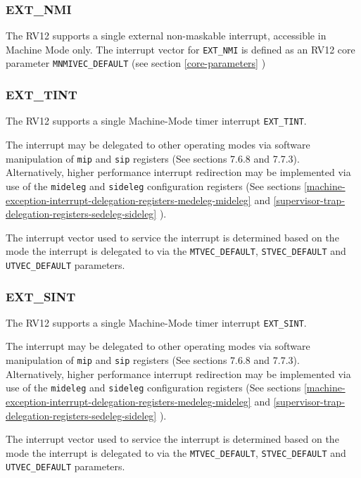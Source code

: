 \subsubsection{EXT\_NMI}\label{ext_nmi}

The RV12 supports a single external non-maskable interrupt, accessible
in Machine Mode only. The interrupt vector for \texttt{EXT\_NMI} is defined as an
RV12 core parameter \texttt{MNMIVEC\_DEFAULT} (see section \ref{core-parameters} )

\subsubsection{EXT\_TINT}\label{ext_tint}

The RV12 supports a single Machine-Mode timer interrupt \texttt{EXT\_TINT}.

The interrupt may be delegated to other operating modes via software
manipulation of \texttt{mip} and \texttt{sip} registers (See sections 7.6.8 and 7.7.3).
Alternatively, higher performance interrupt redirection may be
implemented via use of the \texttt{mideleg} and \texttt{sideleg} configuration registers
(See sections \ref{machine-exception-interrupt-delegation-registers-medeleg-mideleg} and \ref{supervisor-trap-delegation-registers-sedeleg-sideleg} ).

The interrupt vector used to service the interrupt is determined based
on the mode the interrupt is delegated to via the \texttt{MTVEC\_DEFAULT},
\texttt{STVEC\_DEFAULT} and \texttt{UTVEC\_DEFAULT} parameters.

\subsubsection{EXT\_SINT}\label{ext_sint}

The RV12 supports a single Machine-Mode timer interrupt \texttt{EXT\_SINT}.

The interrupt may be delegated to other operating modes via software
manipulation of \texttt{mip} and \texttt{sip} registers (See sections 7.6.8 and 7.7.3).
Alternatively, higher performance interrupt redirection may be
implemented via use of the \texttt{mideleg} and \texttt{sideleg} configuration registers
(See sections \ref{machine-exception-interrupt-delegation-registers-medeleg-mideleg} and \ref{supervisor-trap-delegation-registers-sedeleg-sideleg} ).

The interrupt vector used to service the interrupt is determined based
on the mode the interrupt is delegated to via the \texttt{MTVEC\_DEFAULT},
\texttt{STVEC\_DEFAULT} and \texttt{UTVEC\_DEFAULT} parameters.

